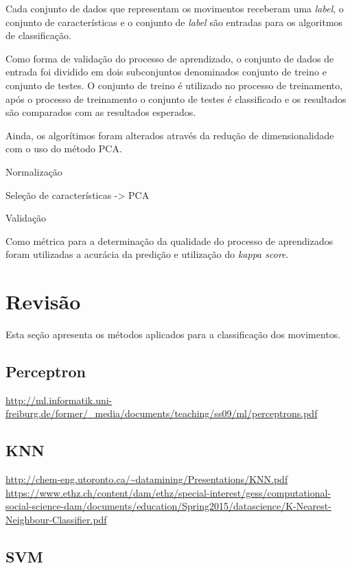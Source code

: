 \documentclass[12pt]{article}
\begin{document}
	Cada conjunto de dados que representam os movimentos receberam uma \emph{label}, o conjunto de características e o conjunto de \emph{label} são entradas para os algoritmos de classificação.
	
	Como forma de validação do processo de aprendizado, o conjunto de dados de entrada foi dividido em dois subconjuntos denominados conjunto de treino e conjunto de testes. O conjunto de treino é utilizado no processo de treinamento, após o processo de treinamento o conjunto de testes é classificado e os resultados são comparados com as resultados esperados.
	
	Ainda, os algorítimos foram alterados através da redução de dimensionalidade com o uso do método PCA.
	 
	Normalização

	Seleção de características -> PCA

	Validação

	Como métrica para a determinação da qualidade do processo de aprendizados foram utilizadas a acurácia da predição e utilização do \emph{kappa score}.

\section{Revisão}

	Esta seção apresenta os métodos aplicados para a classificação dos movimentos.

\subsection{Perceptron}

	\url{http://ml.informatik.uni-freiburg.de/former/_media/documents/teaching/ss09/ml/perceptrons.pdf}

\subsection{KNN}

	\url{http://chem-eng.utoronto.ca/~datamining/Presentations/KNN.pdf}\\
	\url{https://www.ethz.ch/content/dam/ethz/special-interest/gess/computational-social-science-dam/documents/education/Spring2015/datascience/K-Nearest-Neighbour-Classifier.pdf}

\subsection{SVM}
\end{document}
